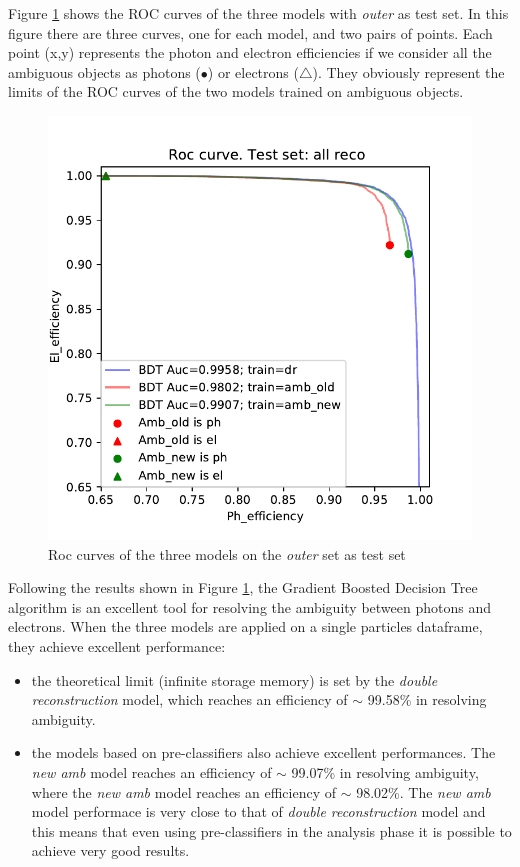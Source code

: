 \documentclass[a4paper, oneside]{book}
\begin{document}
			Figure \ref{fig:last_roc} shows the ROC curves of the three models with \textit{outer} as test set. In this figure there are three curves, one for each model, and two pairs of points. Each point (x,y) represents the photon and electron efficiencies if we consider all the ambiguous objects as photons ($\bullet$) or electrons ($\triangle$). They obviously represent the limits of the ROC curves of the two models trained on ambiguous objects.
			
			\begin{figure}
				\centering
				\includegraphics[width=.65\linewidth]{tesi_images/all_amb_roc.pdf} 
				\caption{Roc curves of the three models on the \textit{outer} set as test set} 
				\label{fig:last_roc}
			\end{figure}
		
			Following the results shown in Figure \ref{fig:last_roc}, the Gradient Boosted Decision Tree algorithm is an excellent tool for resolving the ambiguity between photons and electrons. When the three models are applied on a single particles dataframe, they achieve excellent performance: 
			\begin{itemize}
				\item the theoretical limit (infinite storage memory) is set by the \textit{double reconstruction} model, which reaches an efficiency of $\sim$ 99.58\% in resolving ambiguity.
				\item the models based on pre-classifiers also achieve excellent performances. The \textit{new amb} model reaches an efficiency of $\sim$ 99.07\% in resolving ambiguity, where the \textit{new amb} model reaches an efficiency of $\sim$ 98.02\%.
				The \textit{new amb} model performace is very close to that of \textit{double reconstruction} model and this means that even using pre-classifiers in the analysis phase it is possible to achieve very good results.
			\end{itemize}
		
\end{document}
